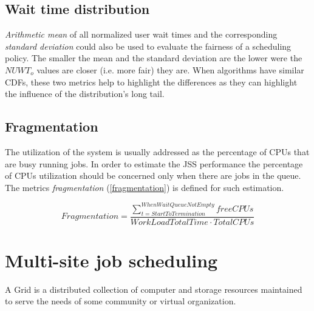\documentclass[a4paper,10pt]{article}
\begin{document}
\subsection{Wait time distribution}
\textit{Arithmetic mean} of all normalized user wait times and the corresponding \textit{standard deviation} could also be used to evaluate the fairness of a scheduling policy. The smaller the mean and the standard deviation are the lower were the  $NUWT_{o}$ values are closer (i.e. more fair) they are. When algorithms have similar CDFs, these two metrics help to highlight the differences as they can highlight the influence of the distribution's long tail.\cite{Rudova 2012}

\subsection{Fragmentation}
The utilization of the system is usually addressed as the percentage of CPUs that are busy running jobs. In order to estimate the JSS performance the percentage of CPUs utilization should be concerned only when there are jobs in the queue. The metrics \textit{fragmentation} (\ref{fragmentation}) is defined for such estimation. \cite{FCFS-malleable}

 \begin{equation}
Fragmentation=\frac{\sum\limits_{t=StartToTermination}^{WhenWaitQueueNotEmpty} freeCPUs}{WorkLoadTotalTime \cdot TotalCPUs}
\label{fragmentation}
\end{equation}


\section{Multi-site job scheduling}
A Grid is a distributed collection of computer and storage resources maintained to serve the needs of some community or virtual organization. \cite{Globus: scheduler}
\end{document}
